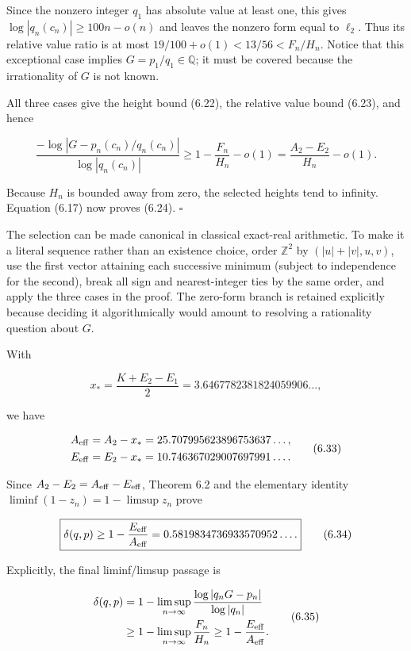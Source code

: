 \documentclass[
  11pt,
]{article}
\begin{document}
Since the nonzero integer \(q_1\) has absolute value at least one, this
gives \(\log|q_n(c_n)|\ge100n-o(n)\) and leaves the nonzero form equal
to \(\ell_2\). Thus its relative value ratio is at most
\(19/100+o(1)<13/56<F_n/H_n\). Notice that this exceptional case implies
\(G=p_1/q_1\in\mathbb Q\); it must be covered because the irrationality
of \(G\) is not known.

All three cases give the height bound (6.22), the relative value bound
(6.23), and hence

\[
 \frac{-\log|G-p_n(c_n)/q_n(c_n)|}{\log|q_n(c_n)|}
 \ge1-\frac{F_n}{H_n}-o(1)
 =\frac{A_2-E_2}{H_n}-o(1).                         \tag{6.32}
\]

Because \(H_n\) is bounded away from zero, the selected heights tend to
infinity. Equation (6.17) now proves (6.24). \(\square\)

The selection can be made canonical in classical exact-real arithmetic.
To make it a literal sequence rather than an existence choice, order
\(\mathbb Z^2\) by \((|u|+|v|,u,v)\), use the first vector attaining
each successive minimum (subject to independence for the second), break
all sign and nearest-integer ties by the same order, and apply the three
cases in the proof. The zero-form branch is retained explicitly because
deciding it algorithmically would amount to resolving a rationality
question about \(G\).

With

\[
 x_* =\frac{K+E_2-E_1}{2}
      =3.6467782381824059906\ldots,
\]

we have

\[
 \begin{aligned}
 A_{\rm eff}&=A_2-x_*=25.707995623896753637\ldots,\\
 E_{\rm eff}&=E_2-x_*=10.746367029007697991\ldots.
 \end{aligned}                                      \tag{6.33}
\]

Since \(A_2-E_2=A_{\rm eff}-E_{\rm eff}\), Theorem 6.2 and the
elementary identity \(\liminf(1-z_n)=1-\limsup z_n\) prove

\[
 \boxed{\delta(q,p)\ge
 1-\frac{E_{\rm eff}}{A_{\rm eff}}
 =0.5819834736933570952\ldots.}                     \tag{6.34}
\]

Explicitly, the final liminf/limsup passage is

\[
 \begin{aligned}
 \delta(q,p)
 &=1-\limsup_{n\to\infty}
       \frac{\log|q_nG-p_n|}{\log|q_n|}\\
 &\ge1-\limsup_{n\to\infty}\frac{F_n}{H_n}
 \ge1-\frac{E_{\rm eff}}{A_{\rm eff}}.
 \end{aligned}                                      \tag{6.35}
\]
\end{document}
